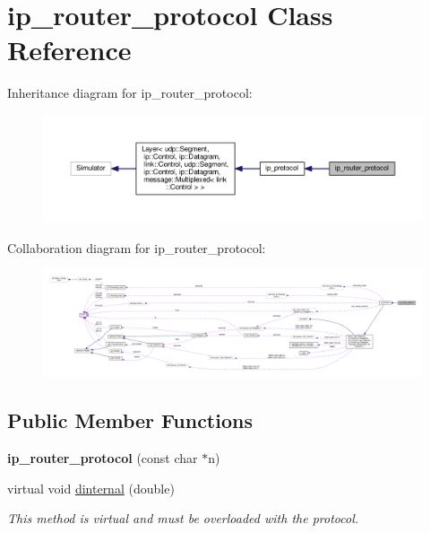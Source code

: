 \hypertarget{classip__router__protocol}{}\section{ip\+\_\+router\+\_\+protocol Class Reference}
\label{classip__router__protocol}


Inheritance diagram for ip\+\_\+router\+\_\+protocol\+:\nopagebreak
\begin{figure}[H]
\begin{center}
\leavevmode
\includegraphics[width=350pt]{classip__router__protocol__inherit__graph}
\end{center}
\end{figure}


Collaboration diagram for ip\+\_\+router\+\_\+protocol\+:\nopagebreak
\begin{figure}[H]
\begin{center}
\leavevmode
\includegraphics[width=350pt]{classip__router__protocol__coll__graph}
\end{center}
\end{figure}
\subsection*{Public Member Functions}
\begin{DoxyCompactItemize}
\item 
{\bfseries ip\+\_\+router\+\_\+protocol} (const char $\ast$n)\hypertarget{classip__router__protocol_ada17ebcf7f7b834d9c62133815d4669d}{}\label{classip__router__protocol_ada17ebcf7f7b834d9c62133815d4669d}

\item 
virtual void \hyperlink{classip__router__protocol_a14cf3c7e1418ee8c6035b79626f99438}{dinternal} (double)
\begin{DoxyCompactList}\small\item\em This method is virtual and must be overloaded with the protocol. \end{DoxyCompactList}\end{DoxyCompactItemize}
